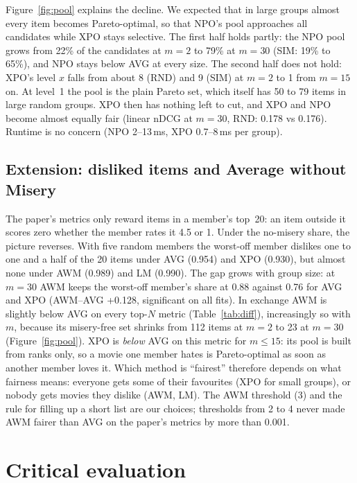 \documentclass[11pt,a4paper]{article}
\newcommand{\npo}{NPO}
\newcommand{\xpo}{XPO}
\begin{document}
Figure~\ref{fig:pool} explains the decline. We expected that in large groups
almost every item becomes Pareto-optimal, so that \npo{}'s pool approaches all
candidates while \xpo{} stays selective. The first half holds partly: the
\npo{} pool grows from 22\% of the candidates at $m=2$ to 79\% at $m=30$ (SIM:
19\% to 65\%), and \npo{} stays below AVG at every size. The second half does
not hold: \xpo{}'s level $x$ falls from about 8 (RND) and 9 (SIM) at $m=2$ to 1
from $m=15$ on. At level~1 the pool is the plain Pareto set, which itself has
50 to 79 items in large random groups. \xpo{} then has nothing left to cut, and
\xpo{} and \npo{} become almost equally fair (linear nDCG at $m=30$, RND:
0.178 vs 0.176). Runtime is no concern (\npo{} 2--13\,ms, \xpo{} 0.7--8\,ms per group).

\subsection{Extension: disliked items and Average without Misery}

The paper's metrics only reward items in a member's top~20: an item outside
it scores zero whether the member rates it 4.5 or 1. Under the no-misery
share, the picture reverses. With five random members the worst-off member
dislikes one to one and a half of the 20 items under AVG (0.954) and \xpo{} (0.930), but
almost none under AWM (0.989) and LM (0.990). The gap grows with group size:
at $m=30$ AWM keeps the worst-off member's share at 0.88 against 0.76 for AVG
and \xpo{} (AWM--AVG +0.128, significant on all fits). In exchange AWM is
slightly below AVG on every top-$N$ metric (Table~\ref{tab:diff}), increasingly
so with $m$, because its misery-free set shrinks from 112 items at $m=2$ to 23
at $m=30$ (Figure~\ref{fig:pool}). \xpo{} is \emph{below} AVG on this metric for
$m\le15$: its pool is built from ranks only, so a movie one member hates is
Pareto-optimal as soon as another member loves it. Which method is ``fairest''
therefore depends on what fairness means: everyone gets some of their
favourites (\xpo{} for small groups), or nobody gets movies they dislike (AWM,
LM). The AWM threshold (3) and the rule for filling up a short list are our
choices; thresholds from 2 to 4 never made AWM fairer than AVG on the paper's
metrics by more than 0.001.

\section{Critical evaluation}
\end{document}
